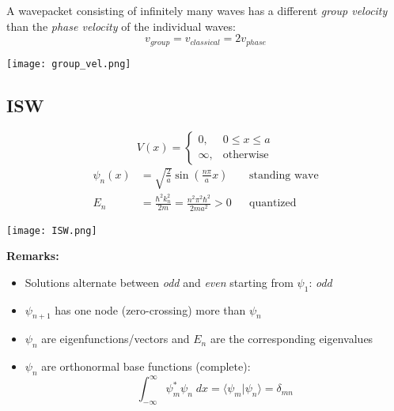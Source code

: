 
A wavepacket consisting of infinitely many waves has a different \textit{group velocity} than the \textit{phase velocity} of the individual waves:
\noindent\begin{equation*}
    v_{group} = v_{classical} = 2v_{phase}
\end{equation*}

\begin{center}
    \texttt{[image: group\_vel.png]}
\end{center}

\subsection{ISW}
\noindent\begin{equation*}
    V(x)=\begin{cases}0,&0\le x\le a\\\infty,&\text{otherwise}\end{cases}
\end{equation*}
\noindent\begin{align*}
    \psi_{n}(x) & =\sqrt{\frac{2}{a}}\sin\left(\frac{n\pi}{a}x\right)                      &  & \text{standing wave} \\
    E_{n}       & =\frac{\hbar^{2}k_{n}^{2}}{2m}=\frac{n^{2}\pi^{2}\hbar^{2}}{2ma^{2}} > 0 &  & \text{quantized}
\end{align*}

\begin{center}
    \texttt{[image: ISW.png]}
\end{center}

\textbf{Remarks:}
\begin{itemize}
    \item Solutions alternate between \textit{odd} and \textit{even} starting from $\psi_1$: \textit{odd}
    \item $\psi_{n+1}$ has one node (zero-crossing) more than $\psi_n$
    \item $\psi_n$ are eigenfunctions/vectors and $E_n$ are the corresponding eigenvalues
    \item $\psi_n$ are orthonormal base functions (complete):
          \noindent\begin{equation*}
              \int_{-\infty}^{\infty} \psi_m^*\psi_n\; dx =\langle \psi_m|\psi_n\rangle= \delta_{mn}
          \end{equation*}
\end{itemize}

